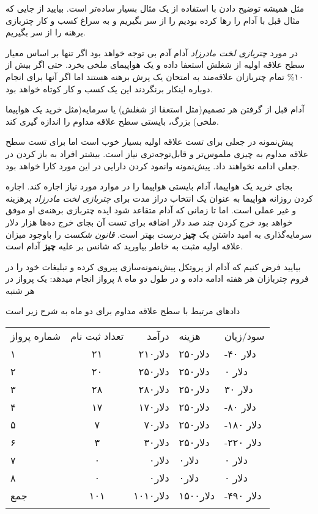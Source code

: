 مثل همیشه توضیح دادن با استفاده از یک مثال بسیار ساده‌تر است. بیایید از
جایی که مثال قبل با آدام را رها کرده‌ بودیم را از سر بگیریم و به سراغ
کسب و کار چتربازی برهنه را از سر بگیریم.

در مورد \emph{چتربازی لخت مادرزاد} آدام آدم بی توجه خواهد بود اگر تنها
بر اساس معیار سطح علاقه اولیه از شغلش استعفا داده و یک هواپیمای ملخی
بخرد. حتی اگر بیش از ۱۰\% تمام چتربازان علاقه‌مند به امتحان یک پرش برهنه
هستند اما اگر آنها برای انجام دوباره اینکار برنگردند این یک کسب و کار
کوتاه خواهد بود.

آدام قبل از گرفتن هر تصمیم(مثل استعفا از شغلش) یا سرمایه(مثل خرید یک
هواپیما ملخی) بزرگ، بایستی سطح علاقه مداوم را اندازه گیری کند.

پیش‌نمونه در جعلی برای تست علاقه اولیه بسیار خوب است اما برای تست سطح
علاقه مداوم به چیزی ملموس‌تر و قابل‌توجه‌تری نیاز است. بیشتر افراد به
باز کردن در جعلی ادامه نخواهند داد. پیش‌نمونه وانمود کردن دارایی در این
مورد کارا خواهد بود.

بجای خرید یک هواپیما، آدام بایستی هواپیما را در موارد مورد نیاز اجاره
کند. اجاره کردن روزانه هواپیما به عنوان یک انتخاب دراز مدت برای
\emph{چتربازی لخت مادرزاد} پرهزینه و غیر عملی است. اما تا زمانی که آدام
متقاعد شود ایده چتربازی برهنه‌ی او موفق خواهد بود خرج کردن چند صد دلار
اضافه برای تست آن بجای خرج ده‌ها هزار دلار سرمایه‌گذاری به امید داشتن یک
\textbf{چیز} \emph{درست} بهتر است. \emph{قانون شکست} را باوجود میزان
علاقه اولیه مثبت به خاطر بیاورید که شانس بر علیه \textbf{چیز} آدام است.

بیایید فرض کنیم که آدام از پروتکل پیش‌نمونه‌سازی پیروی کرده و تبلیغات
خود را در فروم چتربازان هر هفته ادامه داده و در طول دو ماه ۸ پرواز انجام
میدهد: یک پرواز در هر شنبه

دادهای مرتبط با سطح علاقه مداوم برای دو ماه به شرح زیر است

\begin{longtable}[c]{@{}lcrll@{}}
\toprule\addlinespace
شماره پرواز & تعداد ثبت نام & درآمد & هزینه & سود/زیان
\\\addlinespace
\midrule\endhead
۱ & ۲۱ & ۲۱۰دلار & ۲۵۰دلار & -۴۰ دلار
\\\addlinespace
۲ & ۲۰ & ۲۵۰دلار & ۲۵۰دلار & ۰ دلار
\\\addlinespace
۳ & ۲۸ & ۲۸۰دلار & ۲۵۰دلار & ۳۰ دلار
\\\addlinespace
۴ & ۱۷ & ۱۷۰دلار & ۲۵۰دلار & -۸۰ دلار
\\\addlinespace
۵ & ۷ & ۷۰دلار & ۲۵۰دلار & -۱۸۰ دلار
\\\addlinespace
۶ & ۳ & ۳۰دلار & ۲۵۰دلار & -۲۲۰ دلار
\\\addlinespace
۷ & ۰ & ۰دلار & ۰دلار & ۰ دلار
\\\addlinespace
۸ & ۰ & ۰دلار & ۰دلار & ۰ دلار
\\\addlinespace
جمع & ۱۰۱ & ۱۰۱۰دلار & ۱۵۰۰دلار & -۴۹۰ دلار
\\\addlinespace
\bottomrule
\end{longtable}

